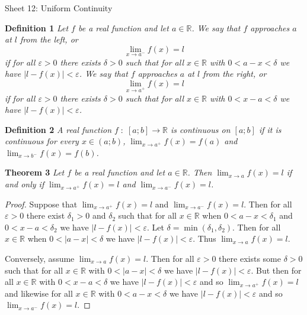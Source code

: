 \documentclass{article}
\begin{document}
\begin{flushleft}

\Large

Sheet 12: Uniform Continuity\newline

\normalsize

\textbf{Definition 1}
\textsl{Let $f$ be a real function and let $a \in \mathbb{R}$. We say that $f$ approaches $a$ at $l$ from the left, or
\[
\lim_{x \rightarrow a^-} f(x) = l
\]
if for all $\varepsilon > 0$ there exists $\delta > 0$ such that for all $x \in \mathbb{R}$ with $0 < a - x < \delta$ we have $|l - f(x)| < \varepsilon$. We say that $f$ approaches $a$ at $l$ from the right, or
\[
\lim_{x \rightarrow a^+} f(x) = l
\]
if for all $\varepsilon > 0$ there exists $\delta > 0$ such that for all $x \in \mathbb{R}$ with $0 < x - a < \delta$ we have $|l - f(x)| < \varepsilon$.}\newline

\textbf{Definition 2}
\textsl{A real function $f \; : \; [a;b] \rightarrow \mathbb{R}$ is continuous on $[a;b]$ if it is continuous for every $x \in (a;b)$, $\lim_{x \rightarrow a^+} f(x) = f(a)$ and $\lim_{x \rightarrow b^-} f(x) = f(b)$.}\newline

\textbf{Theorem 3}
\textsl{Let $f$ be a real function and let $a \in \mathbb{R}$. Then $\lim_{x \rightarrow a} f(x) = l$ if and only if $\lim_{x \rightarrow a^+} f(x) = l$ and $\lim_{x \rightarrow a^-} f(x) = l$.}
\begin{proof}
Suppose that $\lim_{x \rightarrow a^+} f(x) = l$ and $\lim_{x \rightarrow a^-} f(x) = l$. Then for all $\varepsilon > 0$ there exist $\delta_1 > 0$ and $\delta_2$ such that for all $x \in \mathbb{R}$ when $0 < a - x < \delta_1$ and $0 < x - a < \delta_2$ we have $|l - f(x)| < \varepsilon$. Let $\delta = \min (\delta_1 , \delta_2)$. Then for all $x \in \mathbb{R}$ when $0 < |a-x| < \delta$ we have $|l - f(x)| < \varepsilon$. Thus $\lim_{x \rightarrow a} f(x) = l$.\newline

Conversely, assume $\lim_{x \rightarrow a} f(x) = l$. Then for all $\varepsilon > 0$ there exists some $\delta > 0$ such that for all $x \in \mathbb{R}$ with $0 < |a-x| < \delta$ we have $|l-f(x)| < \varepsilon$. But then for all $x \in \mathbb{R}$ with $0 < x - a < \delta$ we have $|l-f(x)| < \varepsilon$ and so $\lim_{x \rightarrow a^+} f(x) = l$ and likewise for all $x \in \mathbb{R}$ with $0 < a - x < \delta$ we have $|l-f(x)| < \varepsilon$ and so $\lim_{x \rightarrow a^-} f(x) = l$.
\end{proof}


\end{flushleft}
\end{document}
